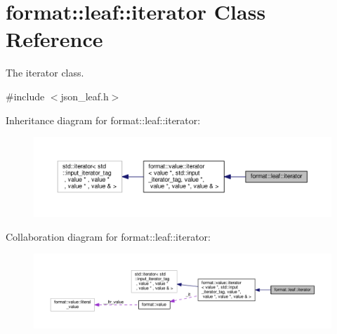 \hypertarget{classformat_1_1leaf_1_1iterator}{}\section{format\+:\+:leaf\+:\+:iterator Class Reference}
\label{classformat_1_1leaf_1_1iterator}


The iterator class.  




{\ttfamily \#include $<$json\+\_\+leaf.\+h$>$}



Inheritance diagram for format\+:\+:leaf\+:\+:iterator\+:
\nopagebreak
\begin{figure}[H]
\begin{center}
\leavevmode
\includegraphics[width=350pt]{classformat_1_1leaf_1_1iterator__inherit__graph}
\end{center}
\end{figure}


Collaboration diagram for format\+:\+:leaf\+:\+:iterator\+:
\nopagebreak
\begin{figure}[H]
\begin{center}
\leavevmode
\includegraphics[width=350pt]{classformat_1_1leaf_1_1iterator__coll__graph}
\end{center}
\end{figure}
